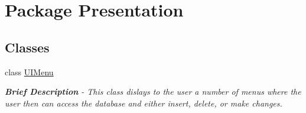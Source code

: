 \hypertarget{namespace_presentation}{}\section{Package Presentation}
\label{namespace_presentation}
\subsection*{Classes}
\begin{DoxyCompactItemize}
\item 
class \hyperlink{class_presentation_1_1_u_i_menu}{U\+I\+Menu}
\begin{DoxyCompactList}\small\item\em {\bfseries Brief Description} -\/ This class dislays to the user a number of menus where the user then can access the database and either insert, delete, or make changes. \end{DoxyCompactList}\end{DoxyCompactItemize}
